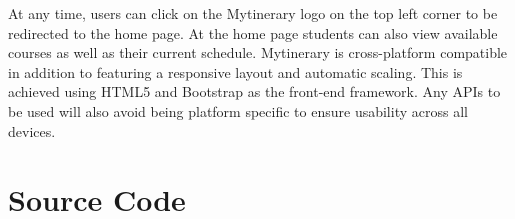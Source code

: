 \documentclass[12pt]{article}
\begin{document}
At any time, users can click on the Mytinerary logo on the top left corner to be redirected to the home page. At the home page students can also view available courses as well as their current schedule. Mytinerary is cross-platform compatible in addition to featuring a responsive layout and automatic scaling. This is achieved using HTML5 and Bootstrap as the front-end framework. Any APIs to be used will also avoid being platform specific to ensure usability across all devices.


\vfill
\newpage
\appendix
\section{Source Code}















%
%

%


\end{document}
